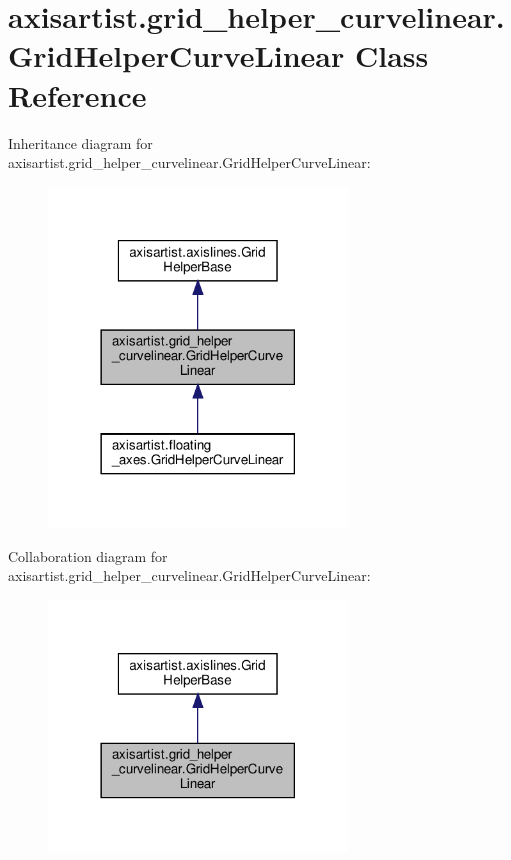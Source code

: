 \hypertarget{classaxisartist_1_1grid__helper__curvelinear_1_1GridHelperCurveLinear}{}\section{axisartist.\+grid\+\_\+helper\+\_\+curvelinear.\+Grid\+Helper\+Curve\+Linear Class Reference}
\label{classaxisartist_1_1grid__helper__curvelinear_1_1GridHelperCurveLinear}


Inheritance diagram for axisartist.\+grid\+\_\+helper\+\_\+curvelinear.\+Grid\+Helper\+Curve\+Linear\+:
\nopagebreak
\begin{figure}[H]
\begin{center}
\leavevmode
\includegraphics[width=225pt]{classaxisartist_1_1grid__helper__curvelinear_1_1GridHelperCurveLinear__inherit__graph}
\end{center}
\end{figure}


Collaboration diagram for axisartist.\+grid\+\_\+helper\+\_\+curvelinear.\+Grid\+Helper\+Curve\+Linear\+:
\nopagebreak
\begin{figure}[H]
\begin{center}
\leavevmode
\includegraphics[width=225pt]{classaxisartist_1_1grid__helper__curvelinear_1_1GridHelperCurveLinear__coll__graph}
\end{center}
\end{figure}

